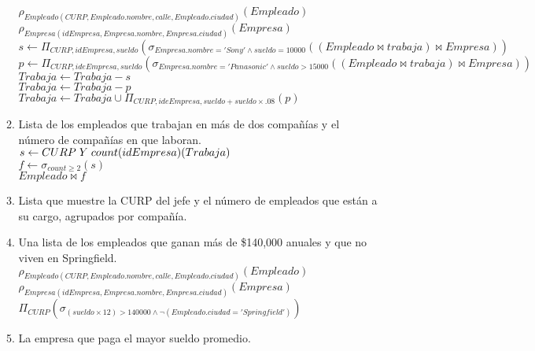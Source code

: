 \documentclass{article}
\begin{document}
\begin{enumerate}
\begin{enumerate}
				$\rho_{Empleado(CURP, Empleado.nombre, calle, Empleado.ciudad)}(Empleado)$\\
				$\rho_{Empresa(idEmpresa, Empresa.nombre, Empresa.ciudad)}(Empresa)$\\
				$s \leftarrow \Pi_{CURP,idEmpresa, sueldo}(\sigma_{Empresa.nombre = 'Sony' \land sueldo = 10000}((Empleado \bowtie trabaja) \bowtie Empresa))$\\
				$p \leftarrow \Pi_{CURP, ideEmpresa, sueldo}(\sigma_{Empresa.nombre = 'Panasonic' \land sueldo > 15000}((Empleado \bowtie trabaja) \bowtie Empresa))$\\
				$Trabaja \leftarrow Trabaja - s$\\
				$Trabaja \leftarrow Trabaja - p$\\
				$Trabaja \leftarrow Trabaja\cup \Pi_{CURP, ideEmpresa, sueldo + sueldo \times .08}(p)$\\
				
				\item Lista de los empleados que trabajan en más de dos compañías y el número de compañías en
				que laboran.\\
				
				$s \leftarrow CURP \hspace{1mm} Y \hspace{1mm} count(idEmpresa)(Trabaja)$\\
				$f \leftarrow \sigma_{count \geq 2}(s)$\\
				$Empleado \bowtie f$\\
				
				\item Lista que muestre la CURP del jefe y el número de empleados que están a su cargo, agrupados
				por compañía.
				
				
				
				\item Una lista de los empleados que ganan más de \$140,000 anuales y que no viven en Springfield.\\
				
				$\rho_{Empleado(CURP, Empleado.nombre, calle, Empleado.ciudad)}(Empleado)$\\
				$\rho_{Empresa(idEmpresa, Empresa.nombre, Empresa.ciudad)}(Empresa)$\\
				$\Pi_{CURP}(\sigma_{(sueldo \times 12) > 140 000 \land \lnot(Empleado.ciudad = 'Springfield')})$\\
				
				\item La empresa que paga el mayor sueldo promedio.\\
				

\end{enumerate}
\end{enumerate}
\end{document}
